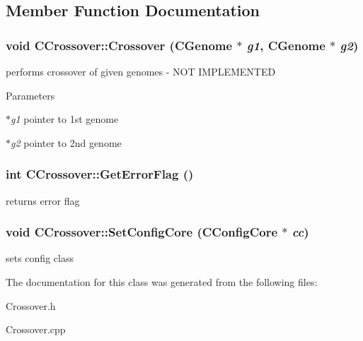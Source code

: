 \subsection{Member Function Documentation}
\hypertarget{classCCrossover_a56c755fbc976d04f42b65a31bde58426}{
\subsubsection[{Crossover}]{\setlength{\rightskip}{0pt plus 5cm}void CCrossover::Crossover ({\bf CGenome} $\ast$ {\em g1}, \/  {\bf CGenome} $\ast$ {\em g2})}}
\label{classCCrossover_a56c755fbc976d04f42b65a31bde58426}
performs crossover of given genomes -\/ NOT IMPLEMENTED


\begin{DoxyParams}{Parameters}
\item[{\em $\ast$g1}]pointer to 1st genome \item[{\em $\ast$g2}]pointer to 2nd genome \end{DoxyParams}
\hypertarget{classCCrossover_a21aa060801ac66d4437213992869c46d}{
\subsubsection[{GetErrorFlag}]{\setlength{\rightskip}{0pt plus 5cm}int CCrossover::GetErrorFlag ()}}
\label{classCCrossover_a21aa060801ac66d4437213992869c46d}
returns error flag \hypertarget{classCCrossover_a71aa63e27a38f97b8f2032b38fd2d1a2}{
\subsubsection[{SetConfigCore}]{\setlength{\rightskip}{0pt plus 5cm}void CCrossover::SetConfigCore ({\bf CConfigCore} $\ast$ {\em cc})}}
\label{classCCrossover_a71aa63e27a38f97b8f2032b38fd2d1a2}
sets config class 

The documentation for this class was generated from the following files:\begin{DoxyCompactItemize}
\item 
Crossover.h\item 
Crossover.cpp\end{DoxyCompactItemize}
